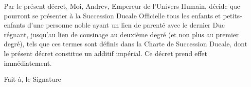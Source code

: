 \documentclass[14pt]{extarticle}
\begin{document}
\begin{framed}
    Par le présent décret, Moi, Andrev, Empereur de l’Univers Humain, décide
    que pourront se présenter à la Succession Ducale Officielle tous les
    enfants et petits-enfants d’une personne noble ayant un lien de parenté
    avec le dernier Duc régnant, jusqu’au lien de cousinage au deuxième degré
    (et non plus au premier degré), tels que ces termes sont définis dans la
    Charte de Succession Ducale, dont le présent décret constitue un additif
    impérial. Ce décret prend effet immédiatement.

    \vspace{7cm}

    \noindent
    Fait à\hspace{4cm}, le \hfill Signature

    \vspace{3cm}

\end{framed}
\end{document}

